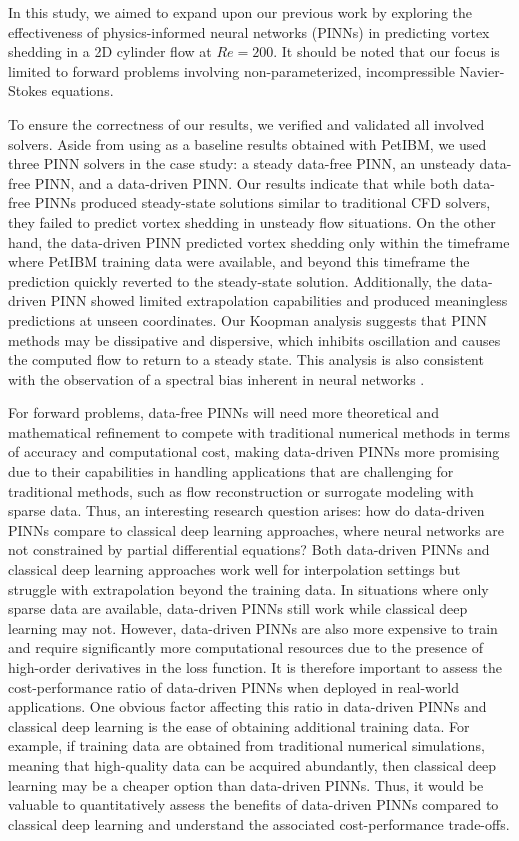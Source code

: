
In this study, we aimed to expand upon our previous work \cite{chuang_experience_2022} by exploring the effectiveness of physics-informed neural networks (PINNs) in predicting vortex shedding in a 2D cylinder flow at $Re = 200$.
It should be noted that our focus is limited to forward problems involving non-parameterized, incompressible Navier-Stokes equations.

To ensure the correctness of our results, we verified and validated all involved solvers.
Aside from using as a baseline results obtained with PetIBM, we used three PINN solvers in the case study: a steady data-free PINN, an unsteady data-free PINN, and a data-driven PINN.
Our results indicate that while both data-free PINNs produced steady-state solutions similar to traditional CFD solvers, they failed to predict vortex shedding in unsteady flow situations.
On the other hand, the data-driven PINN predicted vortex shedding only within the timeframe where PetIBM training data were available, and beyond this timeframe the prediction quickly reverted to the steady-state solution.
Additionally, the data-driven PINN showed limited extrapolation capabilities and produced meaningless predictions at unseen coordinates.
Our Koopman analysis suggests that PINN methods may be dissipative and dispersive, which inhibits oscillation and causes the computed flow to return to a steady state.
This analysis is also consistent with the observation of a spectral bias inherent in neural networks \cite{rahaman_spectral_2019}.

For forward problems, data-free PINNs will need more theoretical and mathematical refinement to compete with traditional numerical methods in terms of accuracy and computational cost, making data-driven PINNs more promising due to their capabilities in handling applications that are challenging for traditional methods, such as flow reconstruction or surrogate modeling with sparse data.
Thus, an interesting research question arises: how do data-driven PINNs compare to classical deep learning approaches, where neural networks are not constrained by partial differential equations?
Both data-driven PINNs and classical deep learning approaches work well for interpolation settings but struggle with extrapolation beyond the training data.
In situations where only sparse data are available, data-driven PINNs still work while classical deep learning may not.
However, data-driven PINNs are also more expensive to train and require significantly more computational resources due to the presence of high-order derivatives in the loss function.
It is therefore important to assess the cost-performance ratio of data-driven PINNs when deployed in real-world applications.
One obvious factor affecting this ratio in data-driven PINNs and classical deep learning is the ease of obtaining additional training data.
For example, if training data are obtained from traditional numerical simulations, meaning that high-quality data can be acquired abundantly, then classical deep learning may be a cheaper option than data-driven PINNs.
Thus, it would be valuable to quantitatively assess the benefits of data-driven PINNs compared to classical deep learning and understand the associated cost-performance trade-offs.

